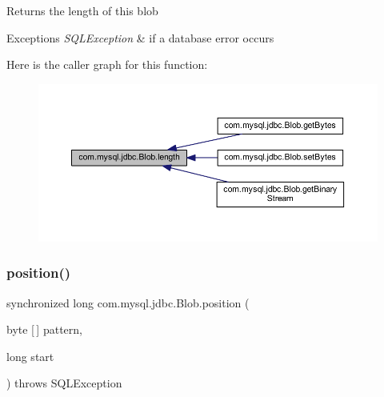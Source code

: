 \begin{DoxyReturn}{Returns}
the length of this blob
\end{DoxyReturn}

\begin{DoxyExceptions}{Exceptions}
{\em S\+Q\+L\+Exception} & if a database error occurs \\
\hline
\end{DoxyExceptions}
Here is the caller graph for this function\+:\nopagebreak
\begin{figure}[H]
\begin{center}
\leavevmode
\includegraphics[width=350pt]{classcom_1_1mysql_1_1jdbc_1_1_blob_aed91f2ff2c2217b4c52294d356253e63_icgraph}
\end{center}
\end{figure}
\mbox{\label{classcom_1_1mysql_1_1jdbc_1_1_blob_a2559b772dc01c0b327cee87b1a5c119e}} 
\subsubsection{\texorpdfstring{position()}{position()}\hspace{0.1cm}{\footnotesize\ttfamily [1/2]}}
{\footnotesize\ttfamily synchronized long com.\+mysql.\+jdbc.\+Blob.\+position (\begin{DoxyParamCaption}\item[{byte \mbox{[}$\,$\mbox{]}}]{pattern,  }\item[{long}]{start }\end{DoxyParamCaption}) throws S\+Q\+L\+Exception}

